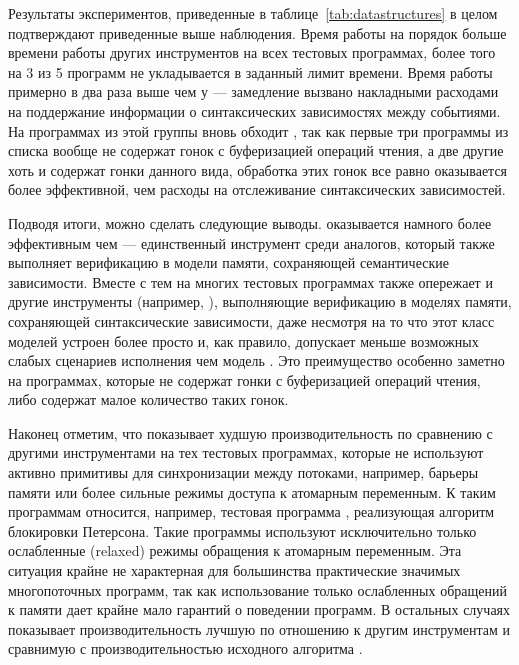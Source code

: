 

Результаты экспериментов, приведенные в таблице~\ref{tab:datastructures}
в целом подтверждают приведенные выше наблюдения. 
Время работы \CDSChecker на порядок больше времени 
работы других инструментов на всех тестовых программах, 
более того на 3 из 5 программ \CDSChecker не укладывается 
в заданный лимит времени. Время работы \hmc примерно в
два раза выше чем у \genmc --- замедление вызвано накладными расходами
на поддержание информации о синтаксических зависимостях между событиями.
На программах из этой группы \wmc вновь обходит \hmc, 
так как первые три программы из списка вообще не содержат 
гонок с буферизацией операций чтения, 
а две другие хоть и содержат гонки данного вида, 
обработка этих гонок все равно оказывается 
более эффективной, чем расходы на отслеживание синтаксических зависимостей.

Подводя итоги, можно сделать следующие выводы. 
\wmc оказывается намного более эффективным чем \CDSChecker --- 
единственный инструмент среди аналогов, который 
также выполняет верификацию в модели памяти, сохраняющей семантические зависимости.    
Вместе с тем на многих тестовых программах \wmc также опережает 
и другие инструменты (например, \hmc),
выполняющие верификацию в моделях памяти, 
сохраняющей синтаксические зависимости, даже 
несмотря на то что этот класс моделей устроен более просто
и, как правило, допускает меньше возможных 
слабых сценариев исполнения чем модель \WkmS.
Это преимущество особенно заметно на программах, 
которые не содержат гонки с буферизацией операций чтения, 
либо содержат малое количество таких гонок. 

Наконец отметим, что \wmc показывает худшую производительность 
по сравнению с другими инструментами на тех тестовых программах, 
которые не используют активно примитивы для синхронизации между потоками, 
например, барьеры памяти или более сильные режимы доступа к атомарным переменным. 
К таким программам относится, например, тестовая программа , 
реализующая алгоритм блокировки Петерсона. 
Такие программы используют исключительно только ослабленные (relaxed)
режимы обращения к атомарным переменным.
Эта ситуация крайне не характерная для большинства 
практические значимых многопоточных программ, 
так как использование только ослабленных обращений к памяти
дает крайне мало гарантий о поведении программ. 
В остальных случаях \wmc показывает производительность 
лучшую по отношению к другим инструментам
и сравнимую с производительностью исходного алгоритма \genmc.


